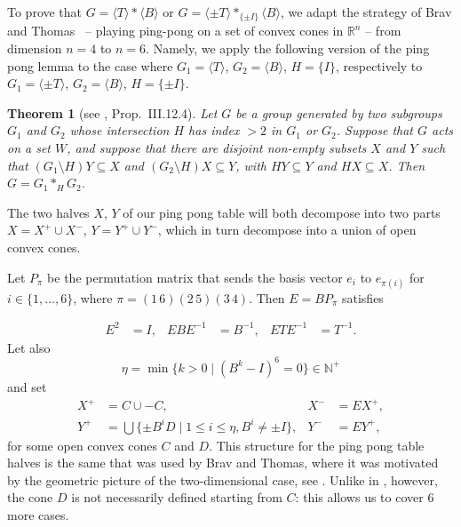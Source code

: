 \documentclass[11pt,a4paper]{amsart}
\newtheorem{thm}{Theorem}
\theoremstyle{definition}
\theoremstyle{definition}
\numberwithin{equation}{section}
\renewcommand{\star}{\ast}
\begin{document}
To prove that $G=\langle T\rangle\ast\langle B\rangle$ or $G=\langle \pm T\rangle\ast_{\{\pm I\}}\langle B\rangle$, we adapt the strategy of Brav and Thomas~\cite{BT} -- playing ping-pong on a set of convex cones in $\mathbb{R}^n$ -- from dimension $n=4$ to $n=6$.
Namely, we apply the following version of the ping pong lemma to the case where $G_1=\langle T\rangle$, $G_2=\langle B\rangle$, $H=\{I\}$, respectively to $G_1=\langle\pm T\rangle$, $G_2=\langle B\rangle$, $H=\{\pm I\}$.

\begin{thm}[see \cite{LS77}, Prop.~III.12.4]\label{th:pingpong}
Let $G$ be a group generated by two subgroups $G_1$ and $G_2$ whose intersection $H$ has index $>2$ in $G_{1}$ or $G_{2}$. Suppose that $G$ acts on a set $W$, and suppose that there are disjoint non-empty subsets $X$ and $Y$ such that $(G_1\setminus H) Y \subseteq X$ and $(G_2\setminus H) X \subseteq Y$, with $H Y \subseteq Y$ and $H X \subseteq X$. Then $G = G_1 \star_{H} G_2$.
\end{thm}


The two halves $X$, $Y$ of our ping pong table will both decompose into two parts $X=X^+\cup X^-$, $Y=Y^+\cup Y^-$, which in turn decompose into a union of open convex cones.

Let $P_{\pi}$ be the permutation matrix that sends the basis vector $e_i$ to $e_{\pi(i)}$ for $i\in \{1,\dots,6\}$, where $\pi=(1\, 6)(2\, 5)(3\, 4)$.
Then $E=BP_\pi$ satisfies

\begin{align}\label{eq:Eprop}
E^2 & =I, & EBE^{-1} & =B^{-1}, & ETE^{-1} & =T^{-1}.
\end{align}
Let also
\begin{equation*}
\eta=\min\{k>0\mid (B^{k}-I)^{6}=0\}\in\mathbb{N}^{+}
\end{equation*}
and set
\begin{equation}\label{eq:table-halves}
\begin{aligned}
X^+& =C\cup -C, & X^- & =EX^+, \\
Y^+ & =\bigcup\{\pm B^i D \mid 1\leq i\leq\eta, B^i\neq\pm I\}, & Y^- & =EY^+,
\end{aligned}
\end{equation}
for some open convex cones $C$ and $D$. This structure for the ping pong table halves is the same that was used by Brav and Thomas, where it was motivated by the geometric picture of the two-dimensional case, see \cite[Sect.~2]{BT}. Unlike in \cite{BT}, however, the cone $D$ is not necessarily defined starting from $C$: this allows us to cover $6$ more cases.
\end{document}
